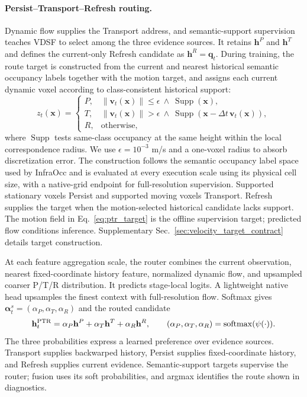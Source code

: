 \documentclass{article}
\begin{document}
\paragraph{Persist--Transport--Refresh routing.}
Dynamic flow supplies the Transport address, and semantic-support supervision
teaches VDSF to select among the three evidence sources.
It retains $\mathbf h^P$ and $\mathbf h^T$ and defines the
current-only Refresh candidate as $\mathbf h^R=\mathbf q_t$. During training,
the route target
is constructed from the current and nearest historical semantic occupancy
labels together with the motion target, and assigns each current dynamic voxel
according to class-consistent historical support:
\begin{equation}
 z_t(\mathbf x)=
 \begin{cases}
 P, & \|\mathbf v_t(\mathbf x)\|\leq\epsilon
      \ \land\ \operatorname{Supp}(\mathbf x),\\
 T, & \|\mathbf v_t(\mathbf x)\|>\epsilon
      \ \land\ \operatorname{Supp}
      (\mathbf x-\Delta t\,\mathbf v_t(\mathbf x)),\\
 R, & \text{otherwise},
 \end{cases}
 \label{eq:ptr_target}
\end{equation}
where $\operatorname{Supp}$ tests same-class occupancy at the same height within
the local correspondence radius. We use $\epsilon=10^{-3}$ m/s and a one-voxel
radius to absorb discretization error. The construction follows the semantic
occupancy label space used by InfraOcc and is evaluated at every execution
scale using its physical cell size, with a native-grid endpoint for
full-resolution supervision. Supported stationary voxels Persist and supported
moving voxels Transport. Refresh supplies the target when the motion-selected
historical candidate lacks support. The motion field in
Eq.~\ref{eq:ptr_target} is the offline supervision target; predicted flow
conditions inference. Supplementary Sec.~\ref{sec:velocity_target_contract}
details target construction.

At each feature aggregation scale, the router combines the current observation,
nearest fixed-coordinate history feature, normalized dynamic flow, and
upsampled coarser P/T/R distribution. It predicts stage-local logits. A
lightweight native head upsamples the finest context with full-resolution flow.
Softmax gives
$\boldsymbol\alpha_t^s=(\alpha_P,\alpha_T,\alpha_R)$ and the routed candidate
\begin{equation}
 \mathbf h^{\rm PTR}_t=\alpha_P\mathbf h^P+
 \alpha_T\mathbf h^T+\alpha_R\mathbf h^R,\qquad
 (\alpha_P,\alpha_T,\alpha_R)=\operatorname{softmax}(\psi(\cdot)).
 \label{eq:ptr_route}
\end{equation}
The three probabilities express a learned preference over evidence sources.
Transport supplies backwarped history, Persist supplies fixed-coordinate
history, and Refresh supplies current evidence. Semantic-support targets
supervise the router; fusion uses its soft probabilities, and argmax identifies
the route shown in diagnostics.
\end{document}
